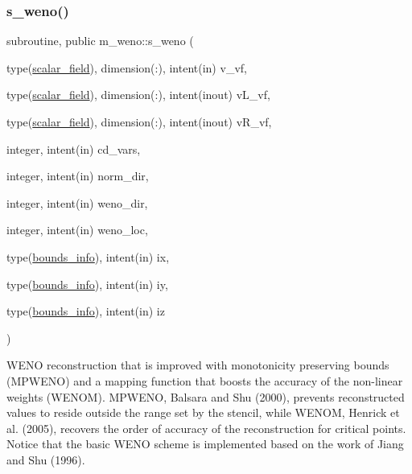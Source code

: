 \subsubsection{\texorpdfstring{s\+\_\+weno()}{s\_weno()}}
{\footnotesize\ttfamily subroutine, public m\+\_\+weno\+::s\+\_\+weno (\begin{DoxyParamCaption}\item[{type(\hyperlink{structm__derived__types_1_1scalar__field}{scalar\+\_\+field}), dimension(\+:), intent(in)}]{v\+\_\+vf,  }\item[{type(\hyperlink{structm__derived__types_1_1scalar__field}{scalar\+\_\+field}), dimension(\+:), intent(inout)}]{v\+L\+\_\+vf,  }\item[{type(\hyperlink{structm__derived__types_1_1scalar__field}{scalar\+\_\+field}), dimension(\+:), intent(inout)}]{v\+R\+\_\+vf,  }\item[{integer, intent(in)}]{cd\+\_\+vars,  }\item[{integer, intent(in)}]{norm\+\_\+dir,  }\item[{integer, intent(in)}]{weno\+\_\+dir,  }\item[{integer, intent(in)}]{weno\+\_\+loc,  }\item[{type(\hyperlink{structm__derived__types_1_1bounds__info}{bounds\+\_\+info}), intent(in)}]{ix,  }\item[{type(\hyperlink{structm__derived__types_1_1bounds__info}{bounds\+\_\+info}), intent(in)}]{iy,  }\item[{type(\hyperlink{structm__derived__types_1_1bounds__info}{bounds\+\_\+info}), intent(in)}]{iz }\end{DoxyParamCaption})}



W\+E\+NO reconstruction that is improved with monotonicity preserving bounds (M\+P\+W\+E\+NO) and a mapping function that boosts the accuracy of the non-\/linear weights (W\+E\+N\+OM). M\+P\+W\+E\+NO, Balsara and Shu (2000), prevents reconstructed values to reside outside the range set by the stencil, while W\+E\+N\+OM, Henrick et al. (2005), recovers the order of accuracy of the reconstruction for critical points. Notice that the basic W\+E\+NO scheme is implemented based on the work of Jiang and Shu (1996). 


